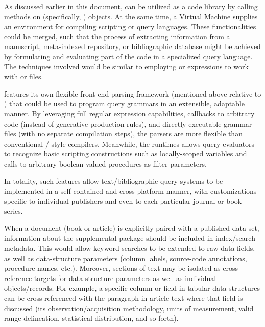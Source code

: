 \documentclass[11pt]{article}
\begin{document}
{{\begin{description}
\vspace*{-4pt}

\item[Full-Text Query Languages]  As discussed earlier in this 
document, \PacTk{} can be utilized as a code library by 
calling methods on \Cpp{} (specifically, \TSOM{}) objects.  
At the same time, a \PacTk{} Virtual Machine supplies an  
environment for compiling scripting or query languages.  
These functionalities could be merged, such that the process 
of extracting information from a \PDF{} manuscript, 
meta-indexed repository, or bibliographic database might be 
achieved by formulating and evaluating part of the code in a 
specialized query language.  The techniques involved 
would be similar to employing \XQuery{} or \XQSE{} 
expressions to work with \JATS{} or \BITS{} files.

\pseudoIndent{} \lPacTk{} features its own flexible front-end parsing 
framework (mentioned above relative to \GTagML{}) that 
could be used to program query grammars in an extensible, 
adaptable manner.  By leveraging full regular expression 
capabilities, callbacks to arbitrary code (instead of 
generative production rules), and directly-executable 
grammar files (with no separate compilation steps), 
the \PacTk{} parsers are more flexible than conventional 
\LEX{}/\YACC{}-style compilers.  Meanwhile, the \VM{} 
runtimes allows query evaluators to recognize basic 
scripting constructions such as locally-scoped variables 
and calls to arbitrary boolean-valued procedures as 
filter parameters.

\pseudoIndent{} In totality, such features allow 
text/bibliographic query systems to be implemented 
in a self-contained and cross-platform manner, 
with customizations specific to individual publishers 
and even to each particular journal or book series.  

\vspace*{-4pt}


\item[Multimedia Cross-Referencing]  When a document (book or article) is explicitly paired with a 
published data set, information about the supplemental package should be 
included in index/search metadata.  This would allow 
keyword searches to be extended to raw data fields, as well 
as data-structure parameters (column labels, source-code 
annotations, procedure names, etc.).  Moreover, sections of text 
may be isolated as cross-reference targets for data-structure parameters 
as well as individual objects/records.  For example, a specific 
column or field in tabular data structures can be cross-referenced 
with the paragraph in article text where that field is 
discussed (its observation/acquisition methodology, units of measurement, 
valid range delineation, statistical distribution, and so forth).


\end{description}}}
\end{document}
